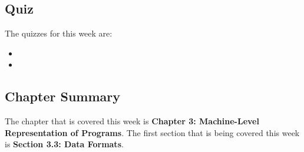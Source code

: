 \subsection{Quiz}

The quizzes for this week are:

\begin{itemize}
    \item {} \textbullet {} 
    \item {}
\end{itemize}

\subsection{Chapter Summary}

The chapter that is covered this week is \textbf{Chapter 3: Machine-Level Representation of Programs}. The first section that is being covered this week is \textbf{Section 3.3: Data Formats}.

